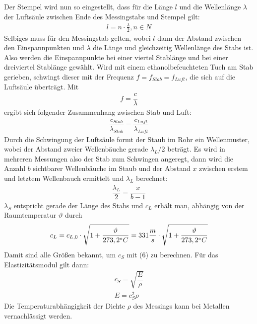 \documentclass{scrartcl}
\begin{document}
Der Stempel wird nun so eingestellt, dass für die Länge $l$ und die Wellenlänge $\lambda$ der Luftsäule zwischen Ende des Messingstabs und Stempel gilt:
\begin{align}
l = n  \cdot \frac{\lambda}{2}, n \in N
\end{align}
Selbiges muss für den Messingstab gelten, wobei $l$ dann der Abstand zwischen den Einspannpunkten und $\lambda$ die Länge und gleichzeitig Wellenlänge des Stabs ist. Also werden die Einspannpunkte bei einer viertel Stablänge und bei einer dreiviertel Stablänge gewählt.
Wird mit einem ethanolbefeuchteten Tuch am Stab gerieben, schwingt dieser mit der Frequenz $f = f_{Stab} = f_{Luft}$, die sich auf die Luftsäule überträgt. Mit 
\begin{align}
f = \dfrac{c}{\lambda}
\end{align}
ergibt sich folgender Zusammenhang zwischen Stab und Luft:
\begin{align}
\dfrac{c_{Stab}}{\lambda_{Stab}} = \dfrac{c_{Luft}}{\lambda_{Luft}}
\end{align}
Durch die Schwingung der Luftsäule formt der Staub im Rohr ein Wellenmuster, wobei der Abstand zweier Wellenbäuche gerade $\lambda_{L} / 2$ beträgt. 
Es wird in mehreren Messungen also der Stab zum Schwingen angeregt, dann wird die Anzahl $b$ sichtbarer Wellenbäuche im Staub und der Abstand $x$ zwischen erstem und letztem Wellenbauch ermittelt und $\lambda_{L}$ berechnet:
\begin{align}
\dfrac{\lambda_{L}}{2} = \dfrac{x}{b-1}
\end{align}
$\lambda_{S}$ entspricht gerade der Länge des Stabs und $c_{L}$ erhält man, abhängig von der Raumtemperatur $\vartheta$ durch
\begin{align}
c_{L} = c_{L, 0} \cdot \sqrt{1+\dfrac{\vartheta}{273,2 \degree C}} = 331 \dfrac{m}{s} \cdot \sqrt{1+\dfrac{\vartheta}{273,2 \degree C}}
\end{align}
Damit sind alle Größen bekannt, um $c_{S}$ mit (6) zu berechnen. Für das Elastizitätsmodul gilt dann:
\begin{align}
c_{S} = \sqrt{\dfrac{E}{\rho}} \\
E = c_{S}^2 \rho
\end{align}
Die Temperaturabhängigkeit der Dichte $\rho$ des Messings kann bei Metallen vernachlässigt werden.
\end{document}
